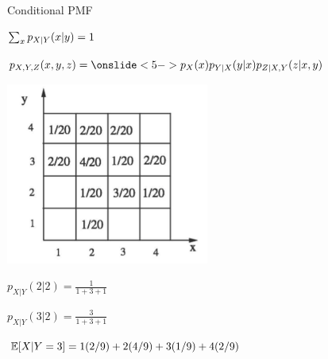 \documentclass[handout,fleqn,aspectratio=169]{beamer}
\begin{document}
\begin{frame}{Conditional PMF}


{
\plitemsep 0.1in
\small

\bci 
\item {} 

\item<3-> $\sum_{x} p_{X|Y}(x|y) = 1$

\item {}


\item $p_{X,Y,Z}(x,y,z) = \onslide<5->{\px \pycx p_{Z|X,Y}(z | x,y)}$
\eci 
}
{
\includegraphics[width=0.5\textwidth]{L6_joint_ex.png}

\medskip
\small

$p_{X|Y}(2|2) = \frac{1}{1+3+1}$

\bigskip
$p_{X|Y}(3|2)= \frac{3}{1+3+1}$

\bigskip

$\mathbb{E}[ X | Y = 3 ] = 1(2/9)+ 2(4/9)+3(1/9)+4(2/9) $

}
\end{frame}
\end{document}
